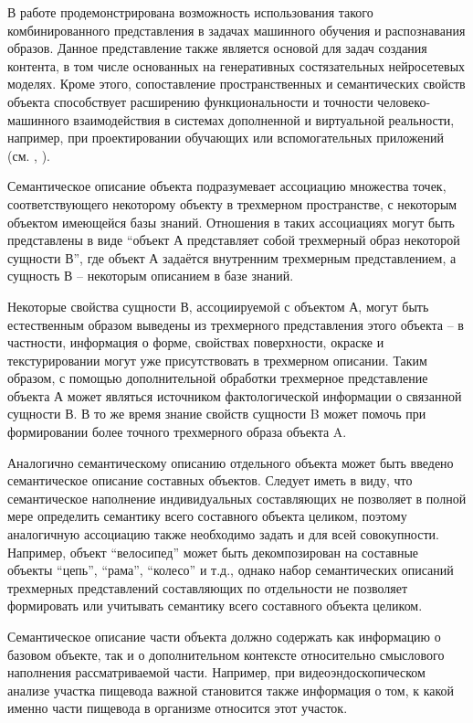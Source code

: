 В работе  продемонстрирована возможность использования такого комбинированного представления в задачах машинного обучения и распознавания образов. Данное представление также является основой для задач создания контента, в том числе основанных на генеративных состязательных нейросетевых моделях. Кроме этого, сопоставление пространственных и семантических свойств объекта способствует расширению функциональности и точности человеко-машинного взаимодействия в системах дополненной и виртуальной реальности, например, при проектировании обучающих или вспомогательных приложений (см. , ).

Семантическое описание объекта подразумевает ассоциацию множества точек, соответствующего некоторому объекту в трехмерном пространстве, с некоторым объектом имеющейся базы знаний. Отношения в таких ассоциациях могут быть представлены в виде ``объект А представляет собой трехмерный образ некоторой сущности В'', где объект А задаётся внутренним трехмерным представлением, а сущность В -- некоторым описанием в базе знаний.

Некоторые свойства сущности В, ассоциируемой с объектом А, могут быть естественным образом выведены из трехмерного представления этого объекта -- в частности, информация о форме, свойствах поверхности, окраске и текстурировании могут уже присутствовать в трехмерном описании. Таким образом, с помощью дополнительной обработки трехмерное представление объекта А может являться источником фактологической информации о связанной сущности В. В то же время знание свойств сущности B может помочь при формировании более точного трехмерного образа объекта A. 

Аналогично семантическому описанию отдельного объекта может быть введено семантическое описание составных объектов. Следует иметь в виду, что семантическое наполнение индивидуальных составляющих не позволяет в полной мере определить семантику всего составного объекта целиком, поэтому аналогичную ассоциацию также необходимо задать и для всей совокупности. Например, объект ``велосипед'' может быть декомпозирован на составные объекты ``цепь'', ``рама'', ``колесо'' и т.д., однако набор семантических описаний трехмерных представлений составляющих по отдельности не позволяет формировать или учитывать семантику всего составного объекта целиком.

Семантическое описание части объекта должно содержать как информацию о базовом объекте, так и о дополнительном контексте относительно смыслового наполнения рассматриваемой части. Например, при видеоэндоскопическом анализе участка пищевода важной становится также информация о том, к какой именно части пищевода в организме относится этот участок.


